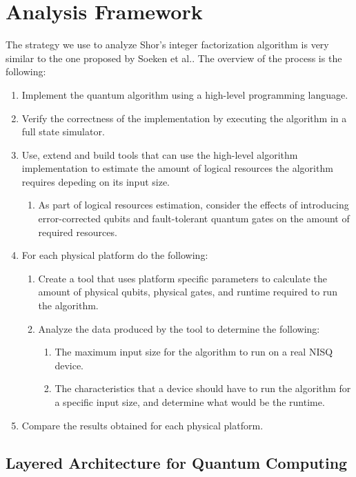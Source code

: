 %
%
\chapter {Analysis Framework}

The strategy we use to analyze Shor's integer factorization algorithm is very similar to the one proposed by Soeken et al.\cite{ResourceEstimationFramework_Soeken_2021}. The overview of the process is the following:
\begin{enumerate}
    \item Implement the quantum algorithm using a high-level programming language.
    \item Verify the correctness of the implementation by executing the algorithm in a full state simulator.
    \item Use, extend and build tools that can use the high-level algorithm implementation to estimate the amount of logical resources the algorithm requires depeding on its input size.
    \begin{enumerate}
        \item As part of logical resources estimation, consider the effects of introducing error-corrected qubits and fault-tolerant quantum gates on the amount of required resources.
    \end{enumerate}
    \item For each physical platform do the following:
    \begin{enumerate}
        \item Create a tool that uses platform specific parameters to calculate the amount of physical qubits, physical gates, and runtime required to run the algorithm.
        \item Analyze the data produced by the tool to determine the following:
        \begin{enumerate}
            \item The maximum input size for the algorithm to run on a real NISQ device.
            \item The characteristics that a device should have to run the algorithm for a specific input size, and determine what would be the runtime.
        \end{enumerate}
    \end{enumerate}
    \item Compare the results obtained for each physical platform.
\end{enumerate}

\section{Layered Architecture for Quantum Computing}

